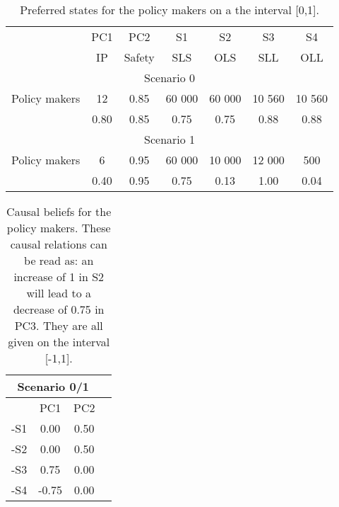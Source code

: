 \documentclass[12pt]{article}
\begin{document}

\begin{table}[h!]
\begin{center}
\begin{tabular}{ |c|c|c|c|c|c|c| } 
\hline

			& PC1	& PC2	& S1		& S2		& S3		& S4  	\\ 
			& IP		& Safety	& SLS	& OLS	& SLL	& OLL 	\\ \hline
			
\multicolumn{7}{|c|}{Scenario 0}										\\ \hline
Policy makers	& 12		& 0.85 	& 60 000 	& 60 000	& 10 560	& 10 560	\\ \hline
			& 0.80	& 0.85	& 0.75	& 0.75	& 0.88	& 0.88	\\ \hline
			
\multicolumn{7}{|c|}{Scenario 1}										\\ \hline
Policy makers	& 6		& 0.95	& 60 000	& 10 000	& 12 000	& 500 	\\ \hline
			& 0.40	& 0.95	& 0.75	& 0.13	& 1.00	& 0.04	\\ \hline
			
\end{tabular}
\end{center}
\caption{Preferred states for the policy makers on a the interval [0,1].}
\label{tab:preferredStates}
\end{table}

\begin{table}[h!]
\begin{center}
\begin{tabular}{ |c|c|c|c|}
 \hline
\multicolumn{3}{|c|}{Scenario 0/1}	\\ \hline \hline
	& PC1	& PC2	\\ \hline
-S1 	& 0.00	& 0.50	\\ \hline
-S2 	& 0.00	& 0.50	\\ \hline
-S3 	& 0.75	& 0.00	\\ \hline
-S4 	&-0.75	& 0.00	\\ 
 \hline
\end{tabular}
\end{center}
\caption{Causal beliefs for the policy makers. These causal relations can be read as: an increase of 1 in S2 will lead to a decrease of 0.75 in PC3. They are all given on the interval [-1,1].}
\label{tab:causalBeliefs}
\end{table}
\end{document}
